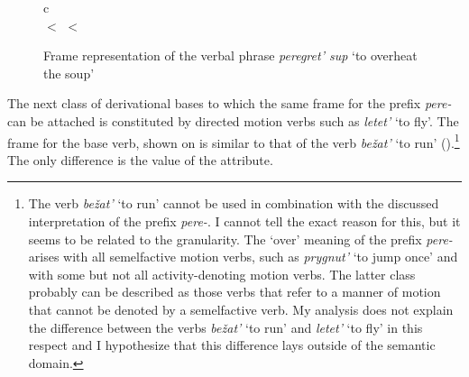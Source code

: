 \begin{figure}
\begin{center}
\begin{tabular}{c}
\\
 $<$  $<$ 
\end{tabular}
\end{center}
\caption{Frame representation of the verbal phrase \textit{peregret' sup} `to overheat the soup' \label{frame:pere:gret:soup}}
\end{figure}

The next class of derivational bases to which the same frame for the prefix \textit{pere-} can be attached is constituted by directed motion verbs such as \textit{letet'} `to fly'. The frame for the base verb, shown on  is similar to that of the verb \textit{be\v{z}at'} `to run' ().\footnote{The verb \textit{be\v{z}at'} `to run' cannot be used in combination with the discussed interpretation of the prefix \textit{pere-}. I cannot tell the exact reason for this, but it seems to be related to the granularity. The `over' meaning of the prefix \textit{pere-} arises with all semelfactive motion verbs, such as \textit{prygnut'} `to jump once' and with some but not all activity-denoting motion verbs. The latter class probably can be described as those verbs that refer to a manner of motion that cannot be denoted by a semelfactive verb. My analysis does not explain the difference between the verbs \textit{be\v{z}at'} `to run' and \textit{letet'} `to fly' in this respect and I hypothesize that this difference lays outside of the semantic domain. } The only difference is the value of the \MANN attribute.

